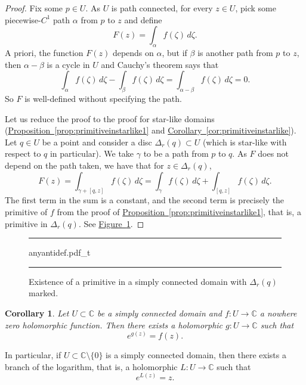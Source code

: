 \documentclass[12pt,openany]{book}
\newcommand{\C}{{\mathbb{C}}}
\theoremstyle{plain}
\newtheorem{cor}[thm]{Corollary}
\theoremstyle{remark}
\theoremstyle{definition}
\newenvironment{myfig}{%
\begin{figure}[h!t]
\noindent\rule{\textwidth}{0.5pt}\vspace{12pt}\par\centering}%
{\par\noindent\rule{\textwidth}{0.5pt}
\end{figure}}
\theoremstyle{exercise}
\theoremstyle{example}
\newcommand{\figureref}[1]{\hyperref[#1]{Figure~\ref*{#1}}}
\newcommand{\propref}[1]{\hyperref[#1]{Proposition~\ref*{#1}}}
\newcommand{\corref}[1]{\hyperref[#1]{Corollary~\ref*{#1}}}
\begin{document}
\begin{proof}
Fix some $p \in U$. As $U$ is path connected, for every $z \in U$, pick
some piecewise-$C^1$ path $\alpha$ from $p$ to $z$
and define
\begin{equation*}
F(z) = \int_\alpha f(\zeta) \, d\zeta .
\end{equation*}
A priori, the function $F(z)$ depends on $\alpha$, but
if $\beta$ is another path from $p$ to $z$, then
$\alpha-\beta$ is a cycle in $U$ and
Cauchy's theorem says that
\begin{equation*}
\int_\alpha f(\zeta) \, d\zeta -
\int_\beta f(\zeta) \, d\zeta 
=
\int_{\alpha-\beta} f(\zeta) \, d\zeta  =  0 .
\end{equation*}
So $F$ is well-defined without specifying the path.

Let us reduce the proof to the proof for 
star-like domains (\propref{prop:primitiveinstarlike1} and
\corref{cor:primitiveinstarlike}).
Let $q \in U$ be a point and consider a disc $\Delta_r(q) \subset U$
(which is star-like with respect to $q$ in particular).
We take $\gamma$ to be a path from $p$ to $q$.
As $F$ does not depend on the path taken, we have that for $z \in \Delta_r(q)$,
\begin{equation*}
F(z) =
\int_{\gamma+[q,z]} f(\zeta) \, d\zeta
=
\int_{\gamma} f(\zeta) \, d\zeta
+
\int_{[q,z]} f(\zeta) \, d\zeta .
\end{equation*}
The first term in the sum is a constant, and the second term is precisely
the primitive of $f$ from the proof of
\propref{prop:primitiveinstarlike1},
that is, a primitive in
$\Delta_r(q)$.
See \figureref{fig:anyantidef}.
\end{proof}

\begin{myfig}
{anyantidef.pdf_t}
\caption{Existence of a primitive in a simply connected
domain with $\Delta_r(q)$ marked.\label{fig:anyantidef}}
\end{myfig}

\begin{cor} \label{cor:simplyconimplieslog}
Let $U \subset \C$ be a simply connected domain and
$f \colon U \to \C$ a nowhere zero holomorphic
function.  Then there exists a holomorphic $g \colon U \to \C$
such that
\begin{equation*}
e^{g(z)} = f(z) .
\end{equation*}
\end{cor}

In particular,
if $U \subset \C \setminus \{ 0 \}$ is a simply connected domain, then
there exists a branch of the logarithm, that is,
a holomorphic $L \colon U \to \C$ such that
\begin{equation*}
e^{L(z)} = z .
\end{equation*}
\end{document}
